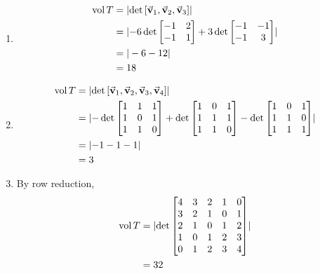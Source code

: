 \documentclass{homework}
\DeclareMathOperator{\vol}{vol}
\begin{document}
\begin{problem}{3}
\begin{enumerate}
\item
\begin{align*}
\vol{T}
&= \abs{\det{[\bvec{v}_1, \bvec{v}_2, \bvec{v}_3]}} \\
&= \abs{-6\det{\bmat{-1&2\\-1&1}}+3\det{\bmat{-1&-1\\-1&3}}} \\
&= |-6 - 12| \\
&= 18
\end{align*}
\item
\begin{align*}
\vol{T}
&= \abs{\det{[\bvec{v}_1, \bvec{v}_2, \bvec{v}_3, \bvec{v}_4]}} \\
&= \abs{-\det{\bmat{1&1&1\\1&0&1\\1&1&0}}
        +\det{\bmat{1&0&1\\1&1&1\\1&1&0}}
        -\det{\bmat{1&0&1\\1&1&0\\1&1&1}}} \\
&= \abs{-1-1-1} \\
&= 3
\end{align*}
\item By row reduction,
\begin{align*}
\vol{T}
&= \abs{\det{\bmat{4&3&2&1&0\\3&2&1&0&1\\2&1&0&1&2\\1&0&1&2&3\\0&1&2&3&4}}} \\
&= 32
\end{align*}
\end{enumerate}
\end{problem}
\end{document}
